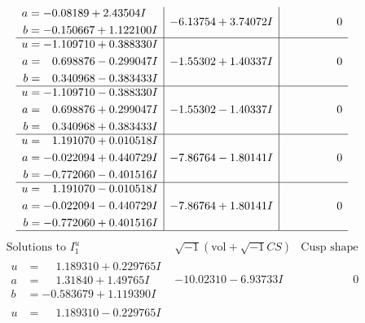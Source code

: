 \documentclass[1p]{elsarticle_modified}
\theoremstyle{definition}
\newcommand{\I}{\sqrt{-1}}
\begin{document}
$$\begin{array}{c|c|c}
\begin{aligned}
a &= -0.08189 + 2.43504 I \\
b &= -0.150667 + 1.122100 I\end{aligned}
 & -6.13754 + 3.74072 I & \phantom{-0.000000 } 0 \\ \hline\begin{aligned}
u &= -1.109710 + 0.388330 I \\
a &= \phantom{-}0.698876 - 0.299047 I \\
b &= \phantom{-}0.340968 - 0.383433 I\end{aligned}
 & -1.55302 + 1.40337 I & \phantom{-0.000000 } 0 \\ \hline\begin{aligned}
u &= -1.109710 - 0.388330 I \\
a &= \phantom{-}0.698876 + 0.299047 I \\
b &= \phantom{-}0.340968 + 0.383433 I\end{aligned}
 & -1.55302 - 1.40337 I & \phantom{-0.000000 } 0 \\ \hline\begin{aligned}
u &= \phantom{-}1.191070 + 0.010518 I \\
a &= -0.022094 + 0.440729 I \\
b &= -0.772060 - 0.401516 I\end{aligned}
 & -7.86764 - 1.80141 I & \phantom{-0.000000 } 0 \\ \hline\begin{aligned}
u &= \phantom{-}1.191070 - 0.010518 I \\
a &= -0.022094 - 0.440729 I \\
b &= -0.772060 + 0.401516 I\end{aligned}
 & -7.86764 + 1.80141 I & \phantom{-0.000000 } 0\\
 \hline 
 \end{array}$$\newpage$$\begin{array}{c|c|c}  
\text{Solutions to }I^u_{1}& \I (\text{vol} + \sqrt{-1}CS) & \text{Cusp shape}\\
 \hline 
\begin{aligned}
u &= \phantom{-}1.189310 + 0.229765 I \\
a &= \phantom{-}1.31840 + 1.49765 I \\
b &= -0.583679 + 1.119390 I\end{aligned}
 & -10.02310 - 6.93733 I & \phantom{-0.000000 } 0 \\ \hline\begin{aligned}
u &= \phantom{-}1.189310 - 0.229765 I \\

\end{aligned}
\end{array}$$
\end{document}
